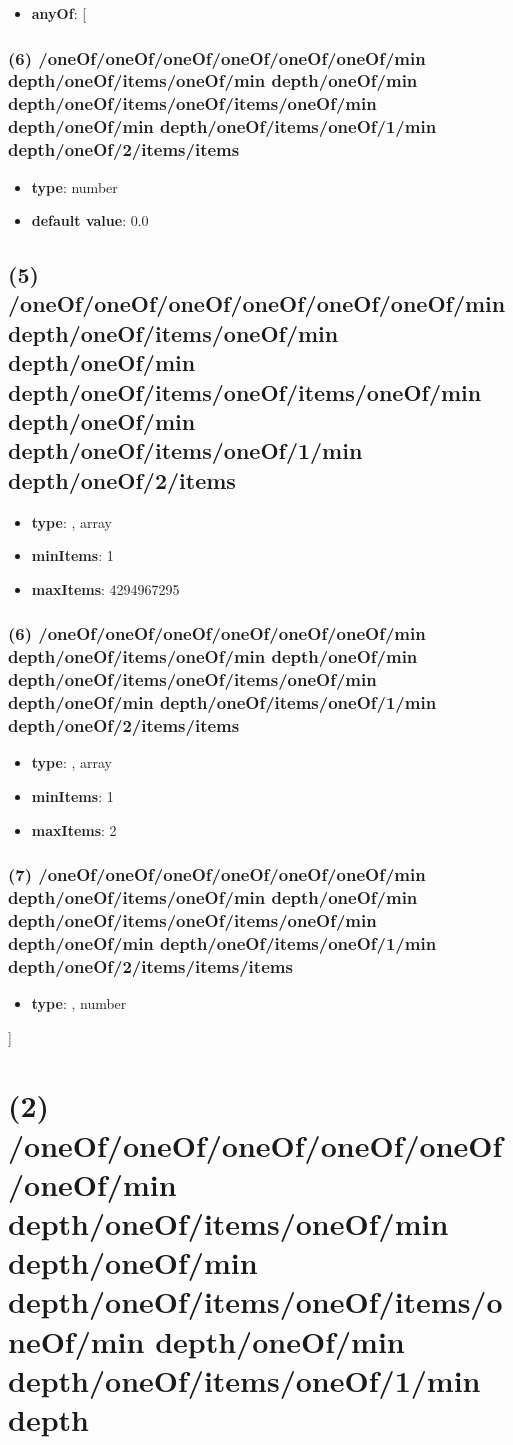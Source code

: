 \begin{itemize}[leftmargin=6em]\item {\bf anyOf}: [\end{itemize}\subsubsection{(6) /oneOf/oneOf/oneOf/oneOf/oneOf/oneOf/min depth/oneOf/items/oneOf/min depth/oneOf/min depth/oneOf/items/oneOf/items/oneOf/min depth/oneOf/min depth/oneOf/items/oneOf/1/min depth/oneOf/2/items/items}
\begin{itemize}[leftmargin=6em]\item {\bf type}: number\item {\bf default value}: 0.0
\end{itemize}\subsection{(5) /oneOf/oneOf/oneOf/oneOf/oneOf/oneOf/min depth/oneOf/items/oneOf/min depth/oneOf/min depth/oneOf/items/oneOf/items/oneOf/min depth/oneOf/min depth/oneOf/items/oneOf/1/min depth/oneOf/2/items}
\begin{itemize}[leftmargin=5em]\item {\bf type}: , array\item {\bf minItems}: 1
\item {\bf maxItems}: 4294967295
\end{itemize}\subsubsection{(6) /oneOf/oneOf/oneOf/oneOf/oneOf/oneOf/min depth/oneOf/items/oneOf/min depth/oneOf/min depth/oneOf/items/oneOf/items/oneOf/min depth/oneOf/min depth/oneOf/items/oneOf/1/min depth/oneOf/2/items/items}
\begin{itemize}[leftmargin=6em]\item {\bf type}: , array\item {\bf minItems}: 1
\item {\bf maxItems}: 2
\end{itemize}\subsubsection{(7) /oneOf/oneOf/oneOf/oneOf/oneOf/oneOf/min depth/oneOf/items/oneOf/min depth/oneOf/min depth/oneOf/items/oneOf/items/oneOf/min depth/oneOf/min depth/oneOf/items/oneOf/1/min depth/oneOf/2/items/items/items}
\begin{itemize}[leftmargin=7em]\item {\bf type}: , number\end{itemize}]\section{(2) /oneOf/oneOf/oneOf/oneOf/oneOf/oneOf/min depth/oneOf/items/oneOf/min depth/oneOf/min depth/oneOf/items/oneOf/items/oneOf/min depth/oneOf/min depth/oneOf/items/oneOf/1/min depth}

